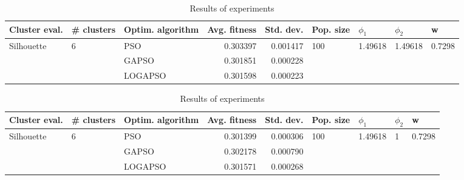 \documentclass{article}
\begin{document}
\begin{table}
\centering
\caption{Results of experiments}
\begin{tabular}{lllrrllll}
\toprule
              Cluster eval. &        \# clusters & Optim. algorithm &  Avg. fitness &  Std. dev. &            Pop. size &               $\phi_{1}$ &               $\phi_{2}$ &                       w \\
\midrule
\multirow{3}{*}{Silhouette} & \multirow{3}{*}{6} &              PSO &      0.303397 &   0.001417 & \multirow{3}{*}{100} & \multirow{3}{*}{1.49618} & \multirow{3}{*}{1.49618} & \multirow{3}{*}{0.7298} \\
                            &                    &            GAPSO &      0.301851 &   0.000228 &                      &                          &                          &                         \\
                            &                    &          LOGAPSO &      0.301598 &   0.000223 &                      &                          &                          &                         \\
\bottomrule
\end{tabular}
\end{table}
\begin{table}
\centering
\caption{Results of experiments}
\begin{tabular}{lllrrllll}
\toprule
              Cluster eval. &        \# clusters & Optim. algorithm &  Avg. fitness &  Std. dev. &            Pop. size &               $\phi_{1}$ &         $\phi_{2}$ &                       w \\
\midrule
\multirow{3}{*}{Silhouette} & \multirow{3}{*}{6} &              PSO &      0.301399 &   0.000306 & \multirow{3}{*}{100} & \multirow{3}{*}{1.49618} & \multirow{3}{*}{1} & \multirow{3}{*}{0.7298} \\
                            &                    &            GAPSO &      0.302178 &   0.000790 &                      &                          &                    &                         \\
                            &                    &          LOGAPSO &      0.301571 &   0.000268 &                      &                          &                    &                         \\
\bottomrule
\end{tabular}
\end{table}
\end{document}
